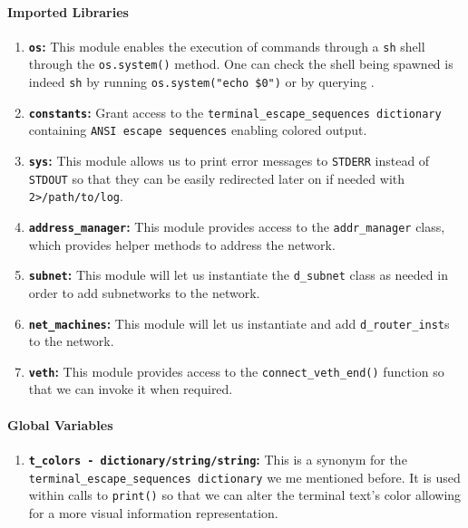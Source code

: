     \paragraph{Imported Libraries}
        \begin{enumerate}
            \item \textbf{\texttt{os}:} This module enables the execution of commands through a \texttt{sh} shell through the \texttt{os.system()} method. One can check the shell being spawned is indeed \texttt{sh} by running \texttt{\allowbreak os.system("echo \$0")} or by querying \cite{bib:man-system}.
            \item \textbf{\texttt{constants}:} Grant access to the \texttt{\allowbreak terminal\_escape\_sequences dictionary} containing \texttt{ANSI escape sequences} enabling colored output.
            \item \textbf{\texttt{sys}:} This module allows us to print error messages to \texttt{STDERR} instead of \texttt{STDOUT} so that they can be easily redirected later on if needed with \texttt{2>/path/to/log}.
            \item \textbf{\texttt{address\_manager}:} This module provides access to the \texttt{addr\_manager} class, which provides helper methods to address the network.
            \item \textbf{\texttt{subnet}:} This module will let us instantiate the \texttt{d\_subnet} class as needed in order to add subnetworks to the network.
            \item \textbf{\texttt{net\_machines}:} This module will let us instantiate and add \texttt{d\_router\_inst}s to the network.
            \item \textbf{\texttt{veth}:} This module provides access to the \texttt{connect\_veth\_end()} function so that we can invoke it when required.
        \end{enumerate}

    \paragraph{Global Variables}
        \begin{enumerate}
            \item \textbf{\texttt{\allowbreak t\_colors - dictionary/string/string}:} This is a synonym for the \texttt{\allowbreak terminal\_escape\_sequences dictionary} we me mentioned before. It is used within calls to \texttt{print()} so that we can alter the terminal text's color allowing for a more visual information representation.
        \end{enumerate}

